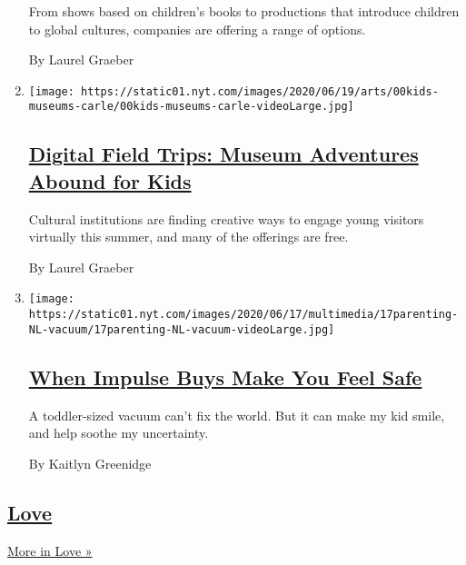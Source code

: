\begin{enumerate}
  From shows based on children's books to productions that introduce
  children to global cultures, companies are offering a range of
  options.

  By Laurel Graeber
\item
  \texttt{[image: https://static01.nyt.com/images/2020/06/19/arts/00kids-museums-carle/00kids-museums-carle-videoLarge.jpg]}

  \hypertarget{digital-field-trips-museum-adventures-abound-for-kids}{%
  \subsection{\texorpdfstring{\href{/2020/06/18/arts/design/kids-museums-summer-virus.html}{Digital
  Field Trips: Museum Adventures Abound for
  Kids}}{Digital Field Trips: Museum Adventures Abound for Kids}}\label{digital-field-trips-museum-adventures-abound-for-kids}}

  Cultural institutions are finding creative ways to engage young
  visitors virtually this summer, and many of the offerings are free.

  By Laurel Graeber
\item
  \texttt{[image: https://static01.nyt.com/images/2020/06/17/multimedia/17parenting-NL-vacuum/17parenting-NL-vacuum-videoLarge.jpg]}

  \hypertarget{when-impulse-buys-make-you-feel-safe}{%
  \subsection{\texorpdfstring{\href{/2020/06/17/parenting/virus-impulse-buys.html}{When
  Impulse Buys Make You Feel
  Safe}}{When Impulse Buys Make You Feel Safe}}\label{when-impulse-buys-make-you-feel-safe}}

  A toddler-sized vacuum can't fix the world. But it can make my kid
  smile, and help soothe my uncertainty.

  By Kaitlyn Greenidge
\end{enumerate}

\hypertarget{love}{%
\subsection{\texorpdfstring{\href{/section/fashion/weddings}{Love}}{Love}}\label{love}}

\href{/section/fashion/weddings}{More in Love »}

